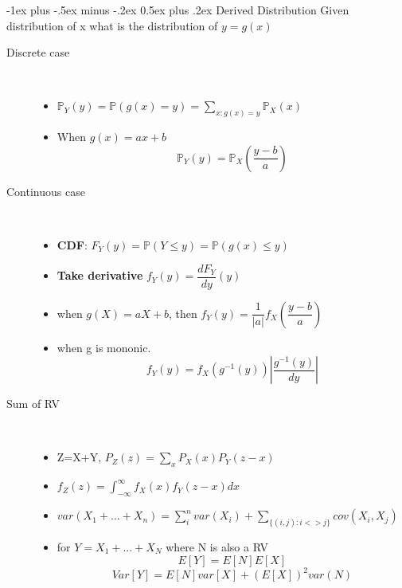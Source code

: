 \documentclass[a4paper, 10pt,landscape]{article}
\makeatletter
\renewcommand{\section}{\@startsection{section}{1}{0mm}%
                                {-1ex plus -.5ex minus -.2ex}%
                                {0.5ex plus .2ex}%
                                {\normalfont\large\bfseries}}
\makeatother
\begin{document}
\begin{multicols*}{4}
\section{Derived Distribution}
Given distribution of x what is the distribution of $y = g(x)$
\begin{description}
	\item[Discrete case]~
		\begin{itemize}
			\item $\mathbb{P}_Y(y) = \mathbb{P}(g(x) = y) = \sum_{x: g(x)=y}\mathbb{P}_X(x)$
			\item When $g(x) = ax + b$  $$\mathbb{P}_Y(y)=\mathbb{P}_X(\dfrac{y-b}{a})$$
		\end{itemize}
	\item[Continuous case]~
		\begin{itemize}
			\item {\bf CDF}: $F_Y(y)=\mathbb{P}(Y \leq y) = \mathbb{P}(g(x) \leq y)$
			\item {\bf Take derivative} $f_Y(y) = \dfrac{dF_Y}{dy}(y)$
			\item when $g(X) = aX +b$, then $f_Y(y) = \dfrac{1}{|a|}f_X(\dfrac{y-b}{a})$
			\item when g is mononic. $$f_Y(y) = f_X(g^{-1}(y)) |\dfrac{g^{-1}(y)}{dy}|$$
		\end{itemize}
	\item[Sum of RV]~
		\begin{itemize}
			\item Z=X+Y, $P_Z(z) = \sum_x P_X(x)P_Y(z-x)$
			\item $f_Z(z) = \int_{-\infty}^{\infty}f_X(x)f_Y(z-x)dx$
			\item $var(X_1+...+X_n) = \sum_i^n var(X_i) + \sum_{\{(i,j):i<>j\}}cov(X_i, X_j)$
			\item for $Y = X_1 + ... + X_N$ where N is also a RV
				$$E[Y] = E[N]E[X]$$
				$$Var[Y] = E[N]var[X] + (E[X])^2var(N)$$
		\end{itemize}



\end{description}


\end{multicols*}
\end{document}

